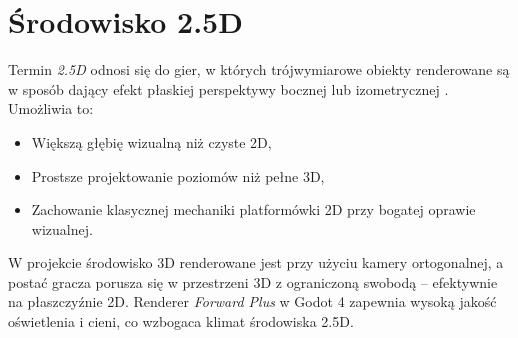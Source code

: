 \section{Środowisko 2.5D}

Termin \textit{2.5D} odnosi się do gier, w których trójwymiarowe obiekty renderowane są w sposób dający efekt płaskiej perspektywy bocznej lub izometrycznej \cite{toftedahl2019taxonomy}. Umożliwia to:
\begin{itemize}
    \item Większą głębię wizualną niż czyste 2D,
    \item Prostsze projektowanie poziomów niż pełne 3D,
    \item Zachowanie klasycznej mechaniki platformówki 2D przy bogatej oprawie wizualnej.
\end{itemize}

W projekcie środowisko 3D renderowane jest przy użyciu kamery ortogonalnej, a postać gracza porusza się w przestrzeni 3D z ograniczoną swobodą – efektywnie na płaszczyźnie 2D. Renderer \textit{Forward Plus} w Godot 4 zapewnia wysoką jakość oświetlenia i cieni, co wzbogaca klimat środowiska 2.5D.
